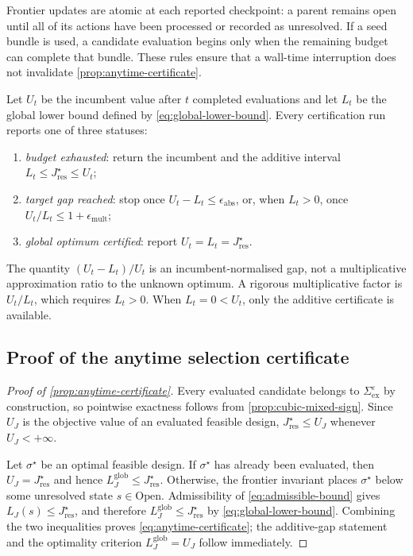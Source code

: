 \documentclass[a4paper,onecolumn,11pt,unpublished]{quantumarticle}
\theoremstyle{remark}
\begin{document}
Frontier updates are atomic at each reported checkpoint: a parent remains
open until all of its actions have been processed or recorded as unresolved.
If a seed bundle is used, a candidate evaluation begins only when the
remaining budget can complete that bundle.  These rules ensure that a
wall-time interruption does not invalidate
\cref{prop:anytime-certificate}.

Let \(U_t\) be the incumbent value after \(t\) completed evaluations and let
\(L_t\) be the global lower bound defined by \cref{eq:global-lower-bound}.  Every
certification run reports one of three statuses:
\begin{enumerate}
    \item \emph{budget exhausted}: return the incumbent and the additive
    interval \(L_t\leq J_{\mathrm{res}}^\star\leq U_t\);
    \item \emph{target gap reached}: stop once
    \(U_t-L_t\leq\epsilon_{\mathrm{abs}}\), or, when \(L_t>0\), once
    \(U_t/L_t\leq1+\epsilon_{\mathrm{mult}}\);
    \item \emph{global optimum certified}: report
    \(U_t=L_t=J_{\mathrm{res}}^\star\).
\end{enumerate}
The quantity \((U_t-L_t)/U_t\) is an incumbent-normalised gap, not a
multiplicative approximation ratio to the unknown optimum.  A rigorous
multiplicative factor is \(U_t/L_t\), which requires \(L_t>0\).  When
\(L_t=0<U_t\), only the additive certificate is available.


\subsection{Proof of the anytime selection certificate}
\label{app:anytime-certificate-proof}

\begin{proof}[Proof of \cref{prop:anytime-certificate}]
Every evaluated candidate belongs to $\Sigma_{\mathrm{ex}}^\varepsilon$ by
construction, so pointwise exactness follows from
\cref{prop:cubic-mixed-sign}.  Since $U_J$ is the objective value of an
evaluated feasible design, $J_{\mathrm{res}}^\star\le U_J$ whenever
$U_J<+\infty$.

Let $\sigma^\star$ be an optimal feasible design.  If $\sigma^\star$ has
already been evaluated, then $U_J=J_{\mathrm{res}}^\star$ and hence
$L_J^{\mathrm{glob}}\le J_{\mathrm{res}}^\star$.  Otherwise, the frontier
invariant places $\sigma^\star$ below some unresolved state
$s\in\mathrm{Open}$.  Admissibility of \cref{eq:admissible-bound} gives
$L_J(s)\le J_{\mathrm{res}}^\star$, and therefore
$L_J^{\mathrm{glob}}\le J_{\mathrm{res}}^\star$ by
\cref{eq:global-lower-bound}.  Combining the two inequalities proves
\cref{eq:anytime-certificate}; the additive-gap statement and the
optimality criterion $L_J^{\mathrm{glob}}=U_J$ follow immediately.
\end{proof}
\end{document}
